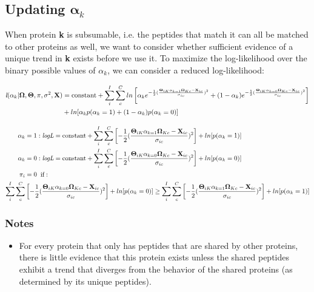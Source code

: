 \subsection*{Updating $\mathbf{\alpha}_{k}$}

When protein \textbf{k} is subsumable, i.e. the peptides that match it can all be matched to other proteins as well, we want to consider whether sufficient evidence of a unique trend in \textbf{k} exists before we use it.  To maximize the log-likelihood over the binary possible values of $\alpha_{k}$, we can consider a reduced log-likelihood:

\begin{align}
\textit{l}(\alpha_{k} | \mathbf{\Omega}, \mathbf{\Theta}, \pi, \sigma^{2}, \textbf{X}) &= \text{constant} + \sum_{i}^{I}\sum_{c}^{C}ln\left[\alpha_{k}e^{-\frac{1}{2}(\frac{\mathbf{\Theta}_{iK}\alpha_{k  = 1}\mathbf{\Omega}_{Kc} - \textbf{X}_{ic}}{\sigma_{ic}})^2} + (1-\alpha_{k})e^{-\frac{1}{2}(\frac{\mathbf{\Theta}_{iK}\alpha_{k  = 0}\mathbf{\Omega}_{Kc} - \textbf{X}_{ic}}{\sigma_{ic}})^2}\right]\notag\\
&+ ln[\alpha_{k}p(\alpha_{k} = 1) + (1-\alpha_{k})p(\alpha_{k} = 0)]\notag
\end{align}

\begin{align}
\alpha_{k} &= 1: \textit{logL} = \text{constant} + \sum_{i}^{I}\sum_{c}^{C}\left[{-\frac{1}{2}(\frac{\mathbf{\Theta}_{iK}\alpha_{k  = 1}\mathbf{\Omega}_{Kc} - \textbf{X}_{ic}}{\sigma_{ic}})^2}\right] + ln[p(\alpha_{k} = 1)]\notag\\
\alpha_{k} &= 0: \textit{logL} = \text{constant} + \sum_{i}^{I}\sum_{c}^{C}\left[{-\frac{1}{2}(\frac{\mathbf{\Theta}_{iK}\alpha_{k  = 0}\mathbf{\Omega}_{Kc} - \textbf{X}_{ic}}{\sigma_{ic}})^2}\right] + ln[p(\alpha_{k} = 0)]\notag\\
\pi_{i} &= 0 \hspace{2mm}\text{if}:\notag\\ \sum_{i}^{I}\sum_{c}^{C}&\left[{-\frac{1}{2}(\frac{\mathbf{\Theta}_{iK}\alpha_{k  = 0}\mathbf{\Omega}_{Kc} - \textbf{X}_{ic}}{\sigma_{ic}})^2}\right] + ln[p(\alpha_{k} = 0)] \ge \sum_{i}^{I}\sum_{c}^{C}\left[{-\frac{1}{2}(\frac{\mathbf{\Theta}_{iK}\alpha_{k  = 1}\mathbf{\Omega}_{Kc} - \textbf{X}_{ic}}{\sigma_{ic}})^2}\right] + ln[p(\alpha_{k} = 1)]
\end{align}

\subsubsection*{Notes}

\begin{itemize}
\item For every protein that only has peptides that are shared by other proteins, there is little evidence that this protein exists unless the shared peptides exhibit a trend that diverges from the behavior of the shared proteins (as determined by its unique peptides).  
\end{itemize}

